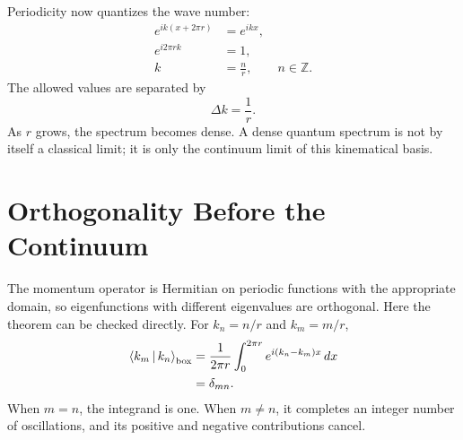 \begin{classroomqa}
\end{classroomqa}

Periodicity now quantizes the wave number:
\begin{align}
  e^{ik(x+2\pi r)}&=e^{ikx},\\
  e^{i2\pi rk}&=1,\\
  k&=\frac{n}{r},
  \qquad n\in\mathbb Z.
  \label{eq:k-quantization}
\end{align}
The allowed values are separated by
\begin{equation}
  \Delta k=\frac{1}{r}.
  \label{eq:k-spacing}
\end{equation}
As \(r\) grows, the spectrum becomes dense. A dense quantum spectrum is not
by itself a classical limit; it is only the continuum limit of this
kinematical basis.

\section{Orthogonality Before the Continuum}

The momentum operator is Hermitian on periodic functions with the
appropriate domain, so eigenfunctions with different eigenvalues are
orthogonal. Here the theorem can be checked directly. For
\(k_n=n/r\) and \(k_m=m/r\),
\begin{align}
  \left\langle k_m\,\middle|\,k_n\right\rangle_{\mathrm{box}}
  &=\frac{1}{2\pi r}\int_0^{2\pi r}
      e^{i(k_n-k_m)x}\,dx \\
  &=\delta_{mn}.
  \label{eq:box-orthogonality}
\end{align}
When \(m=n\), the integrand is one. When \(m\neq n\), it completes an
integer number of oscillations, and its positive and negative contributions
cancel.

\begin{classroomqa}
\end{classroomqa}

